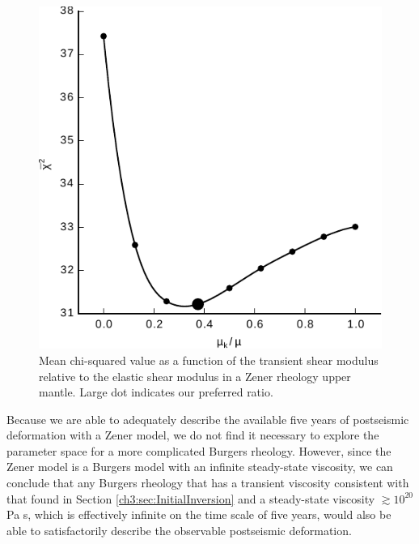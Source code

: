 \begin{figure}
\includegraphics[scale=1.0]{ch3/figures/2016jb013114-f13}
\caption{Mean chi-squared value as a function of the transient shear
modulus relative to the elastic shear modulus in a Zener rheology
upper mantle. Large dot indicates our preferred ratio.}
\label{ch3:fig:ShearModulusRatio}
\end{figure}

Because we are able to adequately describe the available five years of
postseismic deformation with a Zener model, we do not find it
necessary to explore the parameter space for a more complicated
Burgers rheology.  However, since the Zener model is a Burgers model
with an infinite steady-state viscosity, we can conclude that any
Burgers rheology that has a transient viscosity consistent with that
found in Section \ref{ch3:sec:InitialInversion} and a steady-state
viscosity $\gtrsim10^{20}$ Pa s, which is effectively infinite on the
time scale of five years, would also be able to satisfactorily
describe the observable postseismic deformation.
  
